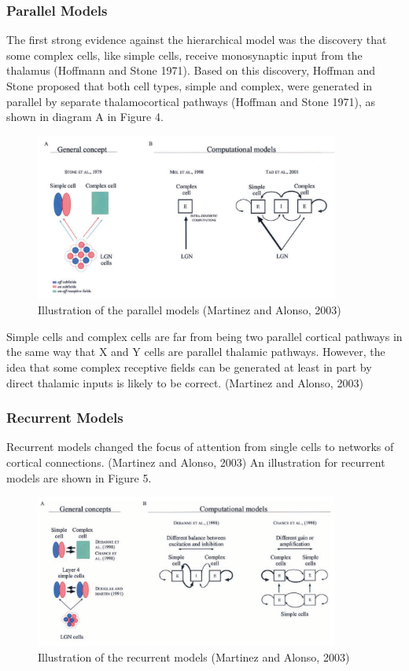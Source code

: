 \subsubsection{Parallel Models}
\par The first strong evidence against the hierarchical model was the discovery that some complex cells, like simple cells, receive monosynaptic input from the thalamus (Hoffmann and Stone 1971). Based on this discovery, Hoffman and Stone proposed that both cell types, simple and complex, were generated in parallel by separate thalamocortical pathways (Hoffman and Stone 1971), as shown in diagram A in Figure 4. 
\begin{figure}[H]
\centering
    \includegraphics[width=10cm]{figures/models/parallel-models.png}
     \caption{Illustration of the parallel models (Martinez and Alonso, 2003)}
\end{figure}

\par Simple cells and complex cells are far from being two parallel cortical pathways in the same way that X and Y cells are parallel thalamic pathways. However, the idea that some complex receptive fields can be generated at
least in part by direct thalamic inputs is likely to be correct. (Martinez and Alonso, 2003)

\subsubsection{Recurrent Models}
Recurrent models changed the focus of attention from single cells to networks of cortical connections. (Martinez and Alonso, 2003) An illustration for recurrent models are shown in Figure 5.

\begin{figure}[H]
\centering
    \includegraphics[width=10cm]{figures/models/recurrent-models.png}
     \caption{Illustration of the recurrent models (Martinez and Alonso, 2003)}
\end{figure}



